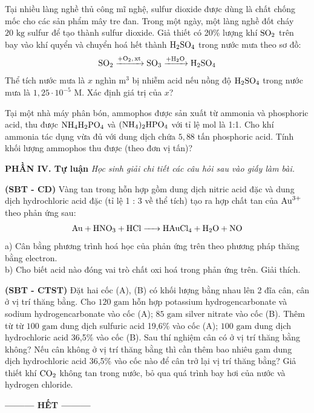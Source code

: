 \documentclass[12pt,a4paper]{article}
\begin{document}
\begin{ex}
Tại nhiều làng nghề thủ công mĩ nghệ, sulfur dioxide được dùng là chất chống mốc cho các sản phẩm mây tre đan. Trong một ngày, một làng nghề đốt cháy $20\text{ kg}$ sulfur để tạo thành sulfur dioxide. Giả thiết có 20\% lượng khí $\ce{SO2}$ trên bay vào khí quyển và chuyển hoá hết thành $\ce{H2SO4}$ trong nước mưa theo sơ đồ:
\[\ce{SO2 ->[+O2, xt] SO3 ->[+H2O] H2SO4}\]
Thể tích nước mưa là $x$ nghìn $\text{m}^3$ bị nhiễm acid nếu nồng độ $\ce{H2SO4}$ trong nước mưa là $1{,}25 \cdot 10^{-5}\text{ M}$. Xác định giá trị của $x$?

\vspace{1.5cm}

\end{ex}

\begin{ex}
Tại một nhà máy phân bón, ammophos được sản xuất từ ammonia và phosphoric acid, thu được $\ce{NH4H2PO4}$ và $\ce{(NH4)2HPO4}$ với tỉ lệ mol là 1:1. Cho khí ammonia tác dụng vừa đủ với dung dịch chứa $5{,}88\text{ tấn}$ phosphoric acid. Tính khối lượng ammophos thu được (theo đơn vị tấn)?

\vspace{1.5cm}

\end{ex}

\vspace{0.3cm}
\noindent\textbf{\large PHẦN IV. Tự luận}
\textit{Học sinh giải chi tiết các câu hỏi sau vào giấy làm bài.}
\vspace{0.2cm}

\begin{ex}
\textbf{(SBT - CD)} Vàng tan trong hỗn hợp gồm dung dịch nitric acid đặc và dung dịch hydrochloric acid đặc (tỉ lệ 1 : 3 về thể tích) tạo ra hợp chất tan của $\ce{Au^{3+}}$ theo phản ứng sau:
\[\ce{Au + HNO3 + HCl -> HAuCl4 + H2O + NO}\]
a) Cân bằng phương trình hoá học của phản ứng trên theo phương pháp thăng bằng electron.\\
b) Cho biết acid nào đóng vai trò chất oxi hoá trong phản ứng trên. Giải thích.

\vspace{2.5cm}

\end{ex}

\begin{ex}
\textbf{(SBT - CTST)} Đặt hai cốc (A), (B) có khối lượng bằng nhau lên 2 đĩa cân, cân ở vị trí thăng bằng. Cho $120\text{ gam}$ hỗn hợp potassium hydrogencarbonate và sodium hydrogencarbonate vào cốc (A); $85\text{ gam}$ silver nitrate vào cốc (B). Thêm từ từ $100\text{ gam}$ dung dịch sulfuric acid 19,6\% vào cốc (A); $100\text{ gam}$ dung dịch hydrochloric acid 36,5\% vào cốc (B). Sau thí nghiệm cân có ở vị trí thăng bằng không? Nếu cân không ở vị trí thăng bằng thì cần thêm bao nhiêu gam dung dịch hydrochloric acid 36,5\% vào cốc nào để cân trở lại vị trí thăng bằng? Giả thiết khí $\ce{CO2}$ không tan trong nước, bỏ qua quá trình bay hơi của nước và hydrogen chloride.

\vspace{3.5cm}

\end{ex}

\begin{center}
\textbf{--------- HẾT ---------}
\end{center}
\end{document}
